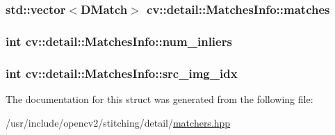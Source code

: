\hypertarget{structcv_1_1detail_1_1MatchesInfo_a36e0824c319b6a9d7ea3eab66e27b6d0}{
\subsubsection[{matches}]{\setlength{\rightskip}{0pt plus 5cm}std\-::vector$<$D\-Match$>$ cv\-::detail\-::\-Matches\-Info\-::matches}}\label{structcv_1_1detail_1_1MatchesInfo_a36e0824c319b6a9d7ea3eab66e27b6d0}
\hypertarget{structcv_1_1detail_1_1MatchesInfo_a905005225c80c0b865e44508189634b8}{
\subsubsection[{num\-\_\-inliers}]{\setlength{\rightskip}{0pt plus 5cm}int cv\-::detail\-::\-Matches\-Info\-::num\-\_\-inliers}}\label{structcv_1_1detail_1_1MatchesInfo_a905005225c80c0b865e44508189634b8}
\hypertarget{structcv_1_1detail_1_1MatchesInfo_a3b89533af56dcc765e0f826a056b0c1f}{
\subsubsection[{src\-\_\-img\-\_\-idx}]{\setlength{\rightskip}{0pt plus 5cm}int cv\-::detail\-::\-Matches\-Info\-::src\-\_\-img\-\_\-idx}}\label{structcv_1_1detail_1_1MatchesInfo_a3b89533af56dcc765e0f826a056b0c1f}


The documentation for this struct was generated from the following file\-:\begin{DoxyCompactItemize}
\item 
/usr/include/opencv2/stitching/detail/\hyperlink{matchers_8hpp}{matchers.\-hpp}\end{DoxyCompactItemize}
